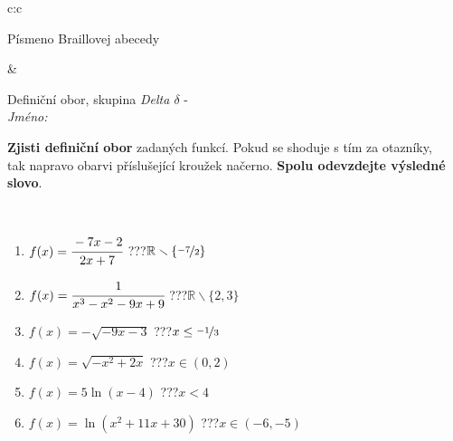 \documentclass[10pt]{report}
\begin{document}
\begin{tabular}{c:c}
\begin{minipage}[c][104.5mm][t]{0.5\linewidth}
\begin{center}
\begin{minipage}{0.20\linewidth}
\begin{center}
{\small Písmeno Braillovej abecedy}
\end{center}
\end{minipage}
\end{center}
\end{minipage}
&
\begin{minipage}[c][104.5mm][t]{0.5\linewidth}
\begin{center}
\vspace{7mm}
{\huge Definiční obor, skupina \textit{Delta $\delta$} -}\\[5mm]
\textit{Jméno:}\phantom{xxxxxxxxxxxxxxxxxxxxxxxxxxxxxxxxxxxxxxxxxxxxxxxxxxxxxxxxxxxxxxxxx}\\[5mm]
\begin{minipage}{0.95\linewidth}
\begin{center}
\textbf{Zjisti definiční obor} zadaných funkcí. Pokud se shoduje s tím za otazníky,\\tak napravo obarvi příslušející kroužek načerno. \textbf{Spolu odevzdejte výsledné slovo}.
\end{center}
\end{minipage}
\\[1mm]
\begin{minipage}{0.79\linewidth}
\begin{center}
\begin{varwidth}{\linewidth}
\begin{enumerate}
\normalsizerrr
\item $f(x)=\cfrac{-7x-2}{2x+7}$\quad \dotfill\; ???\;\dotfill \quad $\mathbb{R}\smallsetminus\{\nicefrac{-7}{2}\}$
\item $f(x)=\cfrac{1}{x^3-x^2-9x+9}$\quad \dotfill\; ???\;\dotfill \quad $\mathbb{R}\smallsetminus\{2,3\}$
\item $f(x)=-\sqrt{-9x-3}$\quad \dotfill\; ???\;\dotfill \quad $x\leq\nicefrac{-1}{3}$
\item $f(x)=\sqrt{-x^2+2x}$\quad \dotfill\; ???\;\dotfill \quad $x\in(0 , 2)$
\item $f(x)=5\ln{(x-4)}$\quad \dotfill\; ???\;\dotfill \quad $x<4$
\item $f(x)=\ln{(x^2+11x+30)}$\quad \dotfill\; ???\;\dotfill \quad $x\in(-6 , -5)$
\end{enumerate}
\end{varwidth}
\end{center}
\end{minipage}
\begin{minipage}{0.20\linewidth}
\begin{center}

\end{center}
\end{minipage}
\end{center}
\end{minipage}
\end{tabular}
\end{document}
